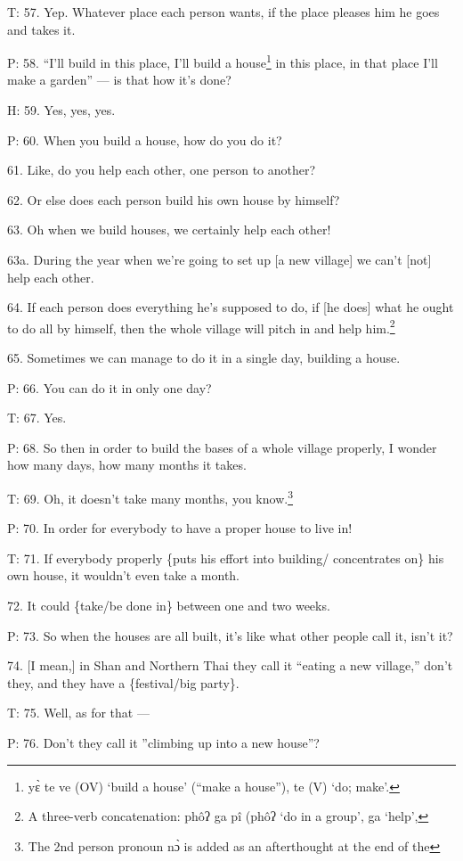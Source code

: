 T: 57. Yep. Whatever place each person wants, if the place pleases him he goes
and takes it.

P: 58. ``I'll build in this place, I'll build a house\footnote{yɛ̀ te ve (OV) `build a house' (``make a house''), te (V) `do; make'.} in this place, in that
place I'll make a garden'' --- is that how it's done?

H: 59. Yes, yes, yes.

P: 60. When you build a house, how do you do it?

61. Like, do you help each other, one person to another?

62. Or else does each person build his own house by himself?

63. Oh when we build houses, we certainly help each other!

63a. During the year when we're going to set up [a new village] we can't [not]
help each other.

64. If each person does everything he's supposed to do, if [he does] what he ought
to do all by himself, then the whole village will pitch in and help him.\footnote{A three-verb concatenation: phôʔ ga pî (phôʔ `do in a group', ga `help',}

65. Sometimes we can manage to do it in a single day, building a house.

P: 66. You can do it in only one day?

T: 67. Yes.

P: 68. So then in order to build the bases of a whole village properly, I wonder
how many days, how many months it takes.

T: 69. Oh, it doesn't take many months, you know.\footnote{The 2nd person pronoun nɔ̀ is added as an afterthought at the end of the}

P: 70. In order for everybody to have a proper house to live in!

T: 71. If everybody properly \{puts his effort into building/ concentrates on\}
his own house, it wouldn't even take a month.

72. It could \{take/be done in\} between one and two weeks.

P: 73. So when the houses are all built, it's like what other people call it, isn't
it?

74. [I mean,] in Shan and Northern Thai they call it ``eating a new village,''
don't they, and they have a \{festival/big party\}.

T: 75. Well, as for that ---

P: 76. Don't they call it ''climbing up into a new house''?

